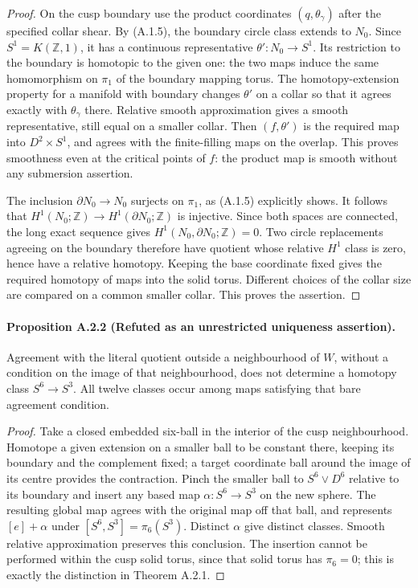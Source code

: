 \begin{proof}
On the cusp boundary use the product coordinates
$(q,\theta_\gamma)$ after the specified collar shear.
By (A.1.5), the boundary circle class extends to $N_0$.
Since $S^1=K(\mathbb Z,1)$, it has a continuous representative
$\theta':N_0\to S^1$.  Its restriction to the boundary is
homotopic to the given one: the two maps induce the same
homomorphism on $\pi_1$ of the boundary mapping torus.
The homotopy-extension property for a manifold with boundary
changes $\theta'$ on a collar so that it agrees exactly with
$\theta_\gamma$ there.  Relative smooth approximation gives
a smooth representative, still equal on a smaller collar.
Then $(f,\theta')$ is the required map into $D^2\times S^1$,
and agrees with the finite-filling maps on the overlap.
This proves smoothness even at the critical points of $f$:
the product map is smooth without any submersion assertion.

The inclusion $\partial N_0\to N_0$ surjects on $\pi_1$,
as (A.1.5) explicitly shows.  It follows that
$H^1(N_0;\mathbb Z)\to H^1(\partial N_0;\mathbb Z)$
is injective.  Since both spaces are connected, the long
exact sequence gives $H^1(N_0,\partial N_0;\mathbb Z)=0$.
Two circle replacements agreeing on the boundary therefore
have quotient whose relative $H^1$ class is zero, hence
have a relative homotopy.  Keeping the base coordinate
fixed gives the required homotopy of maps into the solid
torus.  Different choices of the collar size are compared
on a common smaller collar.  This proves the assertion.
\end{proof}

\paragraph{Proposition A.2.2 (Refuted as an unrestricted uniqueness assertion).}
Agreement with the literal quotient outside a neighbourhood
of $W$, without a condition on the image of that neighbourhood,
does not determine a homotopy class $S^6\to S^3$.  All twelve
classes occur among maps satisfying that bare agreement
condition.

\begin{proof}
Take a closed embedded six-ball in the interior of the cusp
neighbourhood.  Homotope a given extension on a smaller ball
to be constant there, keeping its boundary and the complement
fixed; a target coordinate ball around the image of its centre
provides the contraction.  Pinch the smaller ball to
$S^6\vee D^6$ relative to its boundary and insert any based
map $\alpha:S^6\to S^3$ on the new sphere.  The resulting
global map agrees with the original map off that ball, and
represents $[e]+\alpha$ under $[S^6,S^3]=\pi_6(S^3)$.
Distinct $\alpha$ give distinct classes.  Smooth relative
approximation preserves this conclusion.  The insertion
cannot be performed within the cusp solid torus, since that
solid torus has $\pi_6=0$; this is exactly the distinction
in Theorem A.2.1.
\end{proof}

